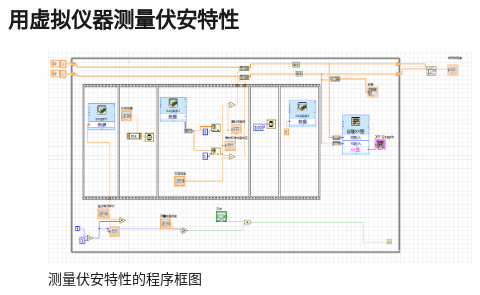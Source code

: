 \documentclass[UTF8]{article}
\begin{document}
\subsection{用虚拟仪器测量伏安特性}
\begin{figure}[H]
    \centering
    \includegraphics[width=17cm]{Fig/5.png}
    \caption{测量伏安特性的程序框图}
\end{figure}
\end{document}
